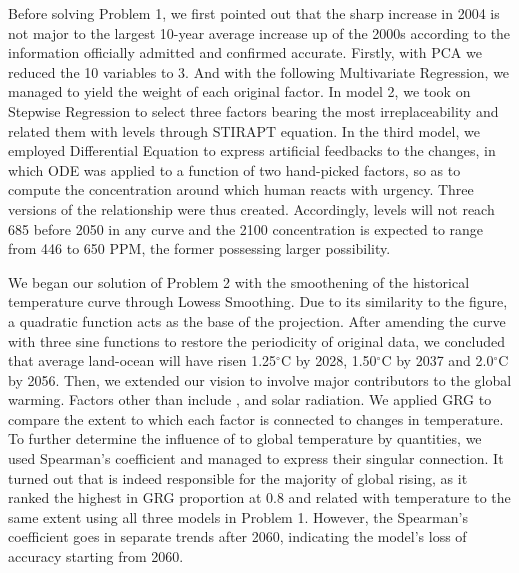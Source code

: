 \documentclass[12pt]{article}
\begin{document}
Before solving Problem 1, we first pointed out that the sharp increase in 2004 is not major to the largest 10-year average increase up of the 2000s according to the information officially admitted and confirmed accurate. Firstly, with PCA we reduced the 10 variables to 3. And with the following Multivariate Regression, we managed to yield the weight of each original factor. In model 2, we took on Stepwise Regression to select three factors bearing the most irreplaceability and related them with  levels through STIRAPT equation. In the third model, we employed Differential Equation to express artificial feedbacks to the changes, in which ODE was applied to a function of two hand-picked factors, so as to compute the concentration around which human reacts with urgency. Three versions of the relationship were thus created. Accordingly,  levels will not reach 685 before 2050 in any curve and the 2100  concentration is expected to range from 446 to 650 PPM, the former possessing larger possibility.

We began our solution of Problem 2 with the smoothening of the historical temperature curve through Lowess Smoothing. Due to its similarity to the figure, a quadratic function acts as the base of the projection. After amending the curve with three sine functions to restore the periodicity of original data, we concluded that average land-ocean will have risen 1.25$^\circ$C by 2028, 1.50$^\circ$C by 2037 and 2.0$^\circ$C by 2056. Then, we extended our vision to involve major contributors to the global warming. Factors other than  include ,  and solar radiation. We applied GRG to compare the extent to which each factor is connected to changes in temperature. To further determine the influence of  to global temperature by quantities, we used Spearman's coefficient and managed to express their singular connection. It turned out that  is indeed responsible for the majority of global rising, as it ranked the highest in GRG proportion at 0.8 and related with temperature to the same extent using all three models in Problem 1. However, the Spearman's coefficient goes in separate trends after 2060, indicating the model's loss of accuracy starting from 2060.
\end{document}
